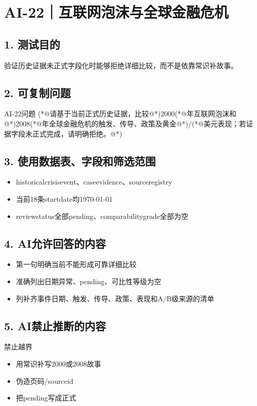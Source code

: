 \documentclass[UTF8,openany,zihao=-4]{ctexbook}
\renewcommand{\_}{\textunderscore\allowbreak}
\begin{document}
\clearpage
\section{AI-22｜互联网泡沫与全球金融危机}
\subsection*{1. 测试目的}
验证历史证据未正式字段化时能够拒绝详细比较，而不是依靠常识补故事。


\subsection*{2. 可复制问题}
\begin{PromptBox}{AI-22问题}
(*@{\promptcjk 请基于当前正式历史证据，比较}@*)2000(*@{\promptcjk 年互联网泡沫和}@*)2008(*@{\promptcjk 年全球金融危机的触发、传导、政策及黄金}@*)/(*@{\promptcjk 美元表现；若证据字段未正式完成，请明确拒绝。}@*)
\end{PromptBox}

\subsection*{3. 使用数据表、字段和筛选范围}
\begin{itemize}
\item historical\_crisis\_event、case\_evidence、source\_registry
\item 当前18条start\_date均1970-01-01
\item review\_status全部pending、comparability\_grade全部为空
\end{itemize}

\subsection*{4. AI允许回答的内容}
\begin{itemize}
\item 第一句明确当前不能形成可靠详细比较
\item 准确列出日期异常、pending、可比性等级为空
\item 列补齐事件日期、触发、传导、政策、表现和A/B级来源的清单
\end{itemize}

\subsection*{5. AI禁止推断的内容}
\begin{dangerbox}{禁止越界}
\begin{itemize}
\item 用常识补写2000或2008故事
\item 伪造页码/source\_id
\item 把pending写成正式
\end{itemize}
\end{dangerbox}
\end{document}
